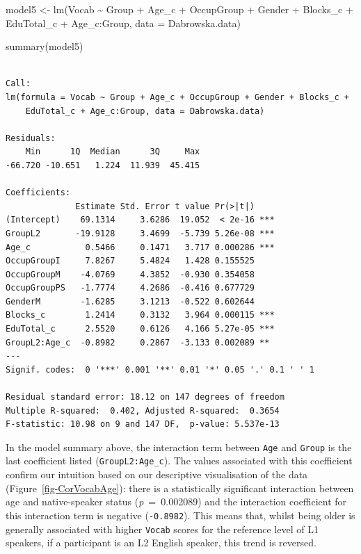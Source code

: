 \documentclass[
  letterpaper,
  DIV=11,
  numbers=noendperiod]{scrreprt}
\newenvironment{Shaded}{\begin{snugshade}}{\end{snugshade}}
\newcommand{\AttributeTok}[1]{\textcolor[rgb]{0.40,0.45,0.13}{#1}}
\newcommand{\FunctionTok}[1]{\textcolor[rgb]{0.28,0.35,0.67}{#1}}
\newcommand{\NormalTok}[1]{\textcolor[rgb]{0.00,0.23,0.31}{#1}}
\newcommand{\OtherTok}[1]{\textcolor[rgb]{0.00,0.23,0.31}{#1}}
\newcommand{\SpecialCharTok}[1]{\textcolor[rgb]{0.37,0.37,0.37}{#1}}
\begin{document}
\begin{Shaded}
\begin{Highlighting}[]
\NormalTok{model5 }\OtherTok{\textless{}{-}} \FunctionTok{lm}\NormalTok{(Vocab }\SpecialCharTok{\textasciitilde{}}\NormalTok{ Group }\SpecialCharTok{+}\NormalTok{ Age\_c }\SpecialCharTok{+}\NormalTok{ OccupGroup }\SpecialCharTok{+}\NormalTok{ Gender }\SpecialCharTok{+}\NormalTok{ Blocks\_c }\SpecialCharTok{+}\NormalTok{ EduTotal\_c }\SpecialCharTok{+}\NormalTok{ Age\_c}\SpecialCharTok{:}\NormalTok{Group, }
             \AttributeTok{data =}\NormalTok{ Dabrowska.data)}

\FunctionTok{summary}\NormalTok{(model5)}
\end{Highlighting}
\end{Shaded}

\begin{verbatim}

Call:
lm(formula = Vocab ~ Group + Age_c + OccupGroup + Gender + Blocks_c + 
    EduTotal_c + Age_c:Group, data = Dabrowska.data)

Residuals:
    Min      1Q  Median      3Q     Max 
-66.720 -10.651   1.224  11.939  45.415 

Coefficients:
              Estimate Std. Error t value Pr(>|t|)    
(Intercept)    69.1314     3.6286  19.052  < 2e-16 ***
GroupL2       -19.9128     3.4699  -5.739 5.26e-08 ***
Age_c           0.5466     0.1471   3.717 0.000286 ***
OccupGroupI     7.8267     5.4824   1.428 0.155525    
OccupGroupM    -4.0769     4.3852  -0.930 0.354058    
OccupGroupPS   -1.7774     4.2686  -0.416 0.677729    
GenderM        -1.6285     3.1213  -0.522 0.602644    
Blocks_c        1.2414     0.3132   3.964 0.000115 ***
EduTotal_c      2.5520     0.6126   4.166 5.27e-05 ***
GroupL2:Age_c  -0.8982     0.2867  -3.133 0.002089 ** 
---
Signif. codes:  0 '***' 0.001 '**' 0.01 '*' 0.05 '.' 0.1 ' ' 1

Residual standard error: 18.12 on 147 degrees of freedom
Multiple R-squared:  0.402, Adjusted R-squared:  0.3654 
F-statistic: 10.98 on 9 and 147 DF,  p-value: 5.537e-13
\end{verbatim}

In the model summary above, the interaction term between \texttt{Age}
and \texttt{Group} is the last coefficient listed
(\texttt{GroupL2:Age\_c}). The values associated with this coefficient
confirm our intuition based on our descriptive visualisation of the data
(Figure~\ref{fig-CorVocabAge}): there is a statistically significant
interaction between age and native-speaker status (\emph{p}~=~0.002089)
and the interaction coefficient for this interaction term is negative
(\texttt{-0.8982}). This means that, whilst being older is generally
associated with higher \texttt{Vocab} scores for the reference level of
L1 speakers, if a participant is an L2 English speaker, this trend is
reversed.
\end{document}
